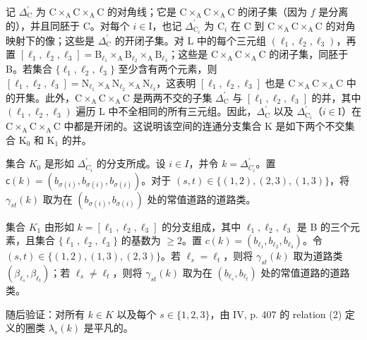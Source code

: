 记 \(\Delta_{\mathrm{C}}^{\prime}\) 为 \(\mathrm{C} \times_{\mathrm{A}} \mathrm{C} \times_{\mathrm{A}} \mathrm{C}\) 的对角线；它是 \(\mathrm{C} \times_{\mathrm{A}} \mathrm{C} \times_{\mathrm{A}} \mathrm{C}\) 的闭子集（因为 \(f\) 是分离的），并且同胚于 C。对每个 \(i \in \mathrm{I}\)，也记 \(\Delta_{\mathrm{C}_i}^{\prime}\) 为 \(\mathrm{C}_i\) 在 C 到 \(\mathrm{C} \times_{\mathrm{A}} \mathrm{C} \times_{\mathrm{A}} \mathrm{C}\) 的对角映射下的像；这些是 \(\Delta_{\mathrm{C}}^{\prime}\) 的开闭子集。对 L 中的每个三元组 \((\ell_1, \ell_2, \ell_3)\)，再置 \([\ell_1, \ell_2, \ell_3] = \mathrm{B}_{\ell_1} \times_{\mathrm{A}} \mathrm{B}_{\ell_2} \times_{\mathrm{A}} \mathrm{B}_{\ell_3}\)；这些是 \(\mathrm{C} \times_{\mathrm{A}} \mathrm{C} \times_{\mathrm{A}} \mathrm{C}\) 的闭子集，同胚于 B。若集合 \(\{\ell_1, \ell_2, \ell_3\}\) 至少含有两个元素，则 \([\ell_1, \ell_2, \ell_3] = \mathrm{N}_{\ell_1} \times_{\mathrm{A}} \mathrm{N}_{\ell_2} \times_{\mathrm{A}} \mathrm{N}_{\ell_3}\)，这表明 \([\ell_1, \ell_2, \ell_3]\) 也是 \(\mathrm{C} \times_{\mathrm{A}} \mathrm{C} \times_{\mathrm{A}} \mathrm{C}\) 中的开集。此外，\(\mathrm{C} \times_{\mathrm{A}} \mathrm{C} \times_{\mathrm{A}} \mathrm{C}\) 是两两不交的子集 \(\Delta_{\mathrm{C}}^{\prime}\) 与 \([\ell_1, \ell_2, \ell_3]\) 的并，其中 \((\ell_1, \ell_2, \ell_3)\) 遍历 L 中不全相同的所有三元组。因此，\(\Delta_{\mathrm{C}}^{\prime}\) 以及 \(\Delta_{\mathrm{C}_i}^{\prime}\)（\(i \in \mathrm{I}\)）在 \(\mathrm{C} \times_{\mathrm{A}} \mathrm{C} \times_{\mathrm{A}} \mathrm{C}\) 中都是开闭的。这说明该空间的连通分支集合 K 是如下两个不交集合 \(\mathrm{K}_0\) 和 \(\mathrm{K}_1\) 的并。

集合 \(K_{0}\) 是形如 \(\Delta_{C_{i}}^{\prime}\) 的分支所成。设 \(i \in I\)，并令 \(k = \Delta_{C_{i}}^{\prime}\)。置 \(\mathsf{c}(k) = (b_{\sigma(i)}, b_{\sigma(i)}, b_{\sigma(i)})\)。对于 \((s, t) \in \{(1,2), (2,3), (1,3)\}\)，将 \(\gamma_{st}(k)\) 取为在 \((b_{\sigma(i)}, b_{\sigma(i)})\) 处的常值道路的道路类。

集合 \(K_{1}\) 由形如 \(k = [\ell_{1}, \ell_{2}, \ell_{3}]\) 的分支组成，其中 \(\ell_{1}, \ell_{2}, \ell_{3}\) 是 B 的三个元素，且集合 \(\{\ell_{1},\ell_{2},\ell_{3}\}\) 的基数为 \(\geqslant 2\)。置 \(c(k)=(b_{\ell_{1}},b_{\ell_{2}},b_{\ell_{3}})\)。令 \((s,t)\in\{(1,2),(1,3),(2,3)\}\)。若 \(\ell_{s}=\ell_{t}\)，则将 \(\gamma_{st}(k)\) 取为道路类 \((\beta_{\ell_{s}},\beta_{\ell_{t}})\)；若 \(\ell_{s}\neq\ell_{t}\)，则将 \(\gamma_{st}(k)\) 取为在 \((b_{\ell_{s}},b_{\ell_{t}})\) 处的常值道路的道路类。

随后验证：对所有 \(k \in K\) 以及每个 \(s \in \{1,2,3\}\)，由 IV, p. 407 的 relation (2) 定义的圈类 \(\lambda_{s}(k)\) 是平凡的。

